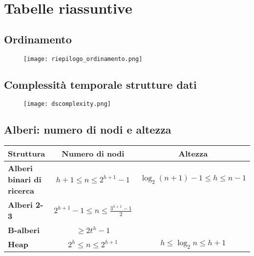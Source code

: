 \section{Tabelle riassuntive}

\subsection{Ordinamento}

\begin{figure}[h]
    \texttt{[image: riepilogo\_ordinamento.png]}
\end{figure}

\subsection{Complessità temporale strutture dati}
\begin{figure}[h]
    \texttt{[image: dscomplexity.png]}
\end{figure}


\subsection{Alberi: numero di nodi e altezza}

\begin{tabular}{|l|c|c|}
    \hline
    \textbf{Struttura} & \textbf{Numero di nodi} & \textbf{Altezza}\\
    \hline
    \textbf{Alberi binari di ricerca} & $h + 1 \le n \le 2^{h+1}-1$ & $\log_2(n+1) - 1 \le h \le n - 1$\\
    \hline
    \textbf{Alberi 2-3} & $2^{h+1}-1 \le n \le \frac{3^{h+1}-1}{2}$ & \space \\
    \hline
    \textbf{B-alberi} & $\ge 2t^h -1$ & \space\\
    \hline
    \textbf{Heap} & $2^h \le n \le 2^{h + 1}$ & $h \le \log_2 n \le h + 1$\\
    \hline
\end{tabular}